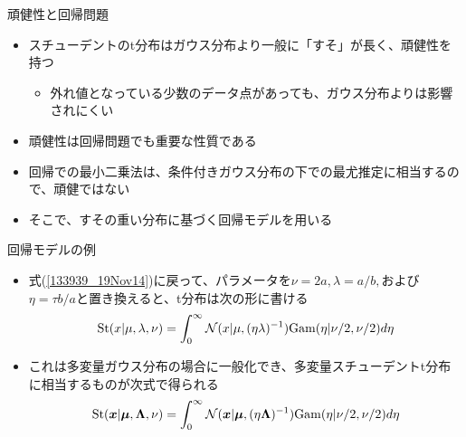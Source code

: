 \begin{frame}{頑健性と回帰問題}
 \begin{itemize}
  \item スチューデントのt分布はガウス分布より一般に「すそ」が長く、\alert{頑健性}を持つ
        \begin{itemize}
         \item 外れ値となっている少数のデータ点があっても、ガウス分布よりは影響されにくい
        \end{itemize}
  \item 頑健性は回帰問題でも重要な性質である
  \item 回帰での最小二乗法は、条件付きガウス分布の下での最尤推定に相当するので、頑健ではない
  \item そこで、すその重い分布に基づく回帰モデルを用いる
 \end{itemize}
\end{frame}

\begin{frame}{回帰モデルの例}
 \begin{itemize}
  \item 式(\ref{133939_19Nov14})に戻って、パラメータを$\nu=2a,\lambda=a/b,$および$\eta=\tau b/a$と置き換えると、t分布は次の形に書ける
        \begin{equation}
         {\rm St}(x|\mu,\lambda,\nu) = \int_{0}^{\infty}\mathcal{N}(x|\mu, (\eta\lambda)^{-1}){\rm Gam}(\eta|\nu/2,\nu/2)d\eta
        \end{equation}
  \item これは多変量ガウス分布の場合に一般化でき、多変量スチューデントt分布に相当するものが次式で得られる
        \begin{equation}
         {\rm St}(\bm{x}|\bm{\mu},\bm{\Lambda},\nu) = \int_{0}^{\infty}\mathcal{N}(\bm{x}|\bm{\mu}, (\eta\bm{\Lambda})^{-1}){\rm Gam}(\eta|\nu/2,\nu/2)d\eta
        \end{equation}
 \end{itemize}
\end{frame}

